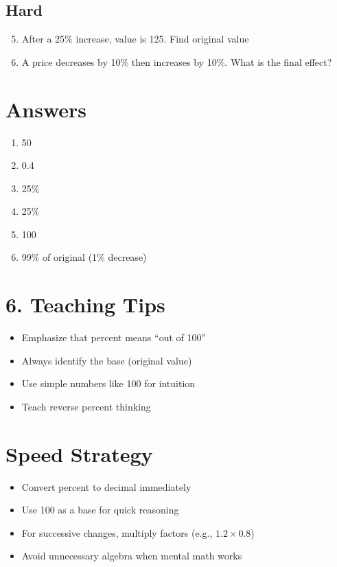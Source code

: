 \subsection*{Hard}
\begin{enumerate}
    \setcounter{enumi}{4}
    \item After a 25\% increase, value is 125. Find original value
    \item A price decreases by 10\% then increases by 10\%. What is the final effect?
\end{enumerate}

\section*{Answers}
\begin{enumerate}
    \item 50
    \item 0.4
    \item 25\%
    \item 25\%
    \item 100
    \item 99\% of original (1\% decrease)
\end{enumerate}

\section*{6. Teaching Tips}
\begin{itemize}
    \item Emphasize that percent means ``out of 100''
    \item Always identify the base (original value)
    \item Use simple numbers like 100 for intuition
    \item Teach reverse percent thinking
\end{itemize}

\section*{Speed Strategy}
\begin{itemize}
    \item Convert percent to decimal immediately
    \item Use 100 as a base for quick reasoning
    \item For successive changes, multiply factors (e.g., $1.2 \times 0.8$)
    \item Avoid unnecessary algebra when mental math works
\end{itemize}
